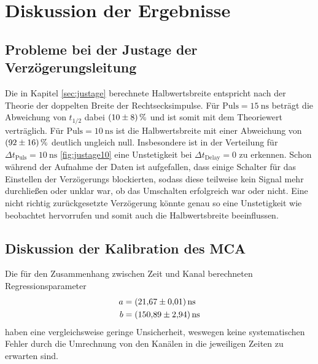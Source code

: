 \section{Diskussion der Ergebnisse}
\label{sec:Diskussion}

\subsection{Probleme bei der Justage der Verzögerungsleitung}
Die in Kapitel \ref{sec:justage} berechnete Halbwertsbreite entspricht nach der Theorie 
der doppelten Breite der Rechtsecksimpulse. Für $\text{Puls}=\SI{15}{\nano\second}$ beträgt
die Abweichung von $t_{1/2}$ dabei $\SI{10\pm 8}{\percent}$ und ist somit mit dem Theoriewert
verträglich. Für $\text{Puls}=\SI{10}{\nano\second}$ ist die Halbwertsbreite mit einer Abweichung
von $\SI{92\pm 16}{\percent}$ deutlich ungleich null.
Insbesondere ist in der Verteilung für $\Delta t_{\text{Puls}}=\SI{10}{\nano\second}$ \ref{fig:justage10} eine 
Unstetigkeit bei $\Delta t_\text{Delay}=0$ zu erkennen. Schon während der Aufnahme der Daten ist aufgefallen, 
dass einige Schalter für das Einstellen der Verzögerungs blockierten, sodass diese teilweise kein Signal mehr 
durchließen oder unklar war, ob das Umschalten erfolgreich war oder nicht. Eine nicht richtig zurückgesetzte 
Verzögerung könnte genau so eine Unstetigkeit wie beobachtet hervorrufen und somit auch die Halbwertsbreite
beeinflussen.

\subsection{Diskussion der Kalibration des MCA}
Die für den Zusammenhang zwischen Zeit und Kanal berechneten Regressionsparameter 
\begin{align*}
    a &= \SI{21.67 \pm 0.01}{\nano\second} \\ 
    b &= \SI{150.89 \pm 2.94}{\nano\second}
 \end{align*}
haben eine vergleichsweise geringe Unsicherheit, weswegen keine systematischen Fehler durch die Umrechnung von den Kanälen in die jeweiligen Zeiten zu erwarten sind. 

